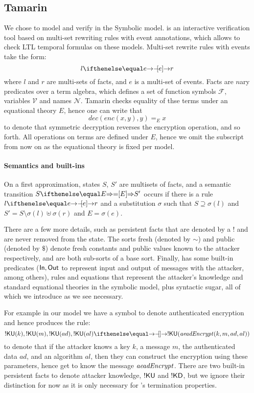 \documentclass[runningheads]{llncs}
\begin{document}
\subsection{Tamarin}
We chose \mTamarin to model and verify \mEdhoc in the Symbolic model. \mTamarin is an interactive verification tool based on multi-set rewriting rules with event annotations, which allows to check LTL temporal formulas on these models.
Multi-set rewrite rules with events take the form:
\[ l \ifarrow[e] r \]
where $l$ and $r$ are multi-sets of facts, and $e$ is a multi-set of events.
Facts are $n$ary predicates over a term algebra, which defines a set of function symbols $\mathcal F$, variables $\mathcal V$ and names $\mathcal N$. Tamarin checks equality of thse terms under an equational theory $E$, hence one can write that
\[ dec(enc(x,y),y) =_E x \]
to denote that symmetric decryption reverses the encryption operation, and so forth. All operations on terms are defined under $E$, hence we omit the subscript from now on as the equational theory is fixed per model.

\paragraph{Semantics and built-ins} On a first approximation, \mTamarin states $S$, $S'$ are multisets of facts, and a semantic transition $S \semarrow[E] S'$ occurs if there is a rule $l \ifarrow[e] r$ and a substitution $\sigma$ such that $S \supseteq \sigma(l)$ and $S' = S \setminus \sigma(l) \uplus \sigma(r)$ and $E = \sigma(e)$.

There are a few more details, such as persistent facts that are denoted by a $!$ and are never removed from the state.
The sorts fresh (denoted by $\sim$) and public (denoted by $\$$) denote fresh constants and public values known to the attacker respectively, and are both sub-sorts of a base sort.
Finally, \mTamarin has some built-in predicates ($\mathsf{In}, \mathsf{Out}$ to represent input and output of messages with the attacker, among others), rules and equations that represent the attacker's knowledge and standard equational theories in the symbolic model, plus syntactic sugar, all of which we introduce as we see necessary.

For example in our model we have a symbol to denote authenticated encryption and hence \mTamarin produces the rule:
\[ !\mKU( k ), !\mKU( m ), !\mKU( ad ), !\mKU( al )
  \ifarrow !\mKU( \mAeadEncrypt(k, m, ad, al) ) \]
to denote that if the attacker knows a key $k$, a message $m$, the authenticated data $ad$, and an algorithm $al$, then they can construct the encryption using these parameters, hence get to know the message $\mathit{aeadEncrypt}$. There are two built-in persistent facts to denote attacker knowledge, $!\mathsf{KU}$ and $!\mathsf{KD}$, but we ignore their distinction for now as it is only necessary for \mTamarin's termination properties.
\end{document}
